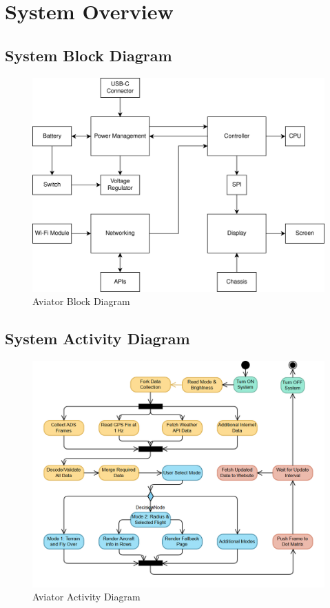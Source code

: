 \clearpage
\section{System Overview}
\subsection{System Block Diagram}
\begin{figure}[h]
    \centering
    \includegraphics[width=16cm]{images/block_diagram.png}
    \caption{Aviator Block Diagram}
\end{figure}

\clearpage
\subsection{System Activity Diagram}
\begin{figure}[h]
    \centering
    \includegraphics[width=16cm]{images/systemactivitydiagram.png} %
    \caption{Aviator Activity Diagram}
\end{figure}

